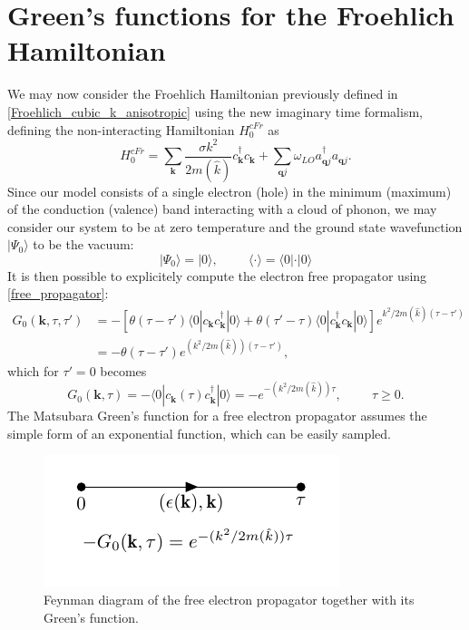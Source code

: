 \documentclass[12pt, a4paper]{report}
\numberwithin{equation}{section}
\begin{document}
\section{Green's functions for the Froehlich Hamiltonian}
We may now consider the Froehlich Hamiltonian previously defined in \ref{Froehlich_cubic_k_anisotropic} using the new imaginary time formalism,
defining the non-interacting Hamiltonian $H^{cFr}_0$ as 
\begin{equation}
    H^{cFr}_0=\sum_\mathbf{k}\frac{\sigma k^2}{2m(\hat{k})}c^\dagger_{\mathbf{k}}c_\mathbf{k}+\sum_{\mathbf{q}j}\omega_{LO}a^\dagger_{\mathbf{q}j}a_{\mathbf{q}j}.
    \label{polaron_non-interacting}
\end{equation}
Since our model consists of a single electron (hole) in the minimum (maximum) of the conduction (valence) band interacting with a cloud of phonon, we may 
consider our system to be at zero temperature and the ground state wavefunction $|\Psi_0\rangle$ to be the vacuum:
\begin{equation}
    |\Psi_0\rangle=|0\rangle,\hspace{1cm}\langle \cdot \rangle=\langle 0|\cdot|0\rangle
\end{equation}
It is then possible to explicitely compute the electron free propagator using \ref{free_propagator}:
\begin{equation}
\begin{split}
    G_0(\mathbf{k},\tau,\tau')&=-\left[\theta(\tau-\tau')\langle 0| c_\mathbf{k}c^\dagger_\mathbf{k}|0\rangle+\theta(\tau'-\tau)\langle 0 | c^\dagger_\mathbf{k}c_\mathbf{k}|0\rangle\right]e^{k^2/2m(\hat{k})(\tau-\tau')}\\
    &=-\theta(\tau-\tau')e^{(k^2/2m(\hat{k}))(\tau-\tau')},
\end{split}
\end{equation}
which for $\tau'=0$ becomes
\begin{equation}
    G_0(\mathbf{k},\tau)=-\langle 0|c_{\mathbf{k}}(\tau)c^\dagger_\mathbf{k}|0\rangle =-e^{-(k^2/2m(\hat{k}))\tau},\hspace{1cm}\tau\ge0.
\end{equation}
The Matsubara Green's function for a free electron propagator assumes the simple form of an exponential function, which can be easily sampled.
\begin{figure}[H]
    \centering
    \includegraphics[scale=1.5]{free_el_propagator.pdf}
    \caption{Feynman diagram of the free electron propagator together with its Green's function.}
    \label{fig:el_prop_free}
\end{figure}
\end{document}
